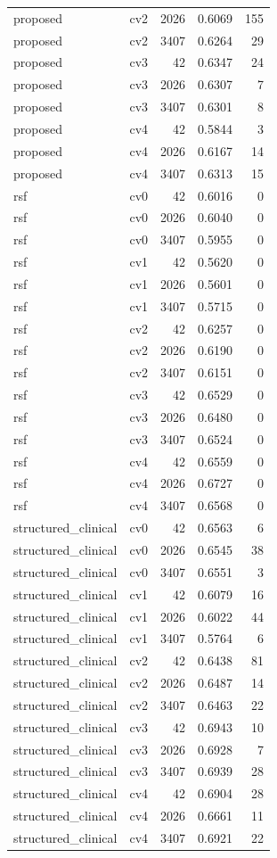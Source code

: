 \documentclass[10pt]{article}
\begin{document}
\begin{longtable}{llrrr}
proposed & cv2 & 2026 & 0.6069 & 155\\
proposed & cv2 & 3407 & 0.6264 & 29\\
proposed & cv3 & 42 & 0.6347 & 24\\
proposed & cv3 & 2026 & 0.6307 & 7\\
proposed & cv3 & 3407 & 0.6301 & 8\\
proposed & cv4 & 42 & 0.5844 & 3\\
proposed & cv4 & 2026 & 0.6167 & 14\\
proposed & cv4 & 3407 & 0.6313 & 15\\
rsf & cv0 & 42 & 0.6016 & 0\\
rsf & cv0 & 2026 & 0.6040 & 0\\
rsf & cv0 & 3407 & 0.5955 & 0\\
rsf & cv1 & 42 & 0.5620 & 0\\
rsf & cv1 & 2026 & 0.5601 & 0\\
rsf & cv1 & 3407 & 0.5715 & 0\\
rsf & cv2 & 42 & 0.6257 & 0\\
rsf & cv2 & 2026 & 0.6190 & 0\\
rsf & cv2 & 3407 & 0.6151 & 0\\
rsf & cv3 & 42 & 0.6529 & 0\\
rsf & cv3 & 2026 & 0.6480 & 0\\
rsf & cv3 & 3407 & 0.6524 & 0\\
rsf & cv4 & 42 & 0.6559 & 0\\
rsf & cv4 & 2026 & 0.6727 & 0\\
rsf & cv4 & 3407 & 0.6568 & 0\\
structured\_clinical & cv0 & 42 & 0.6563 & 6\\
structured\_clinical & cv0 & 2026 & 0.6545 & 38\\
structured\_clinical & cv0 & 3407 & 0.6551 & 3\\
structured\_clinical & cv1 & 42 & 0.6079 & 16\\
structured\_clinical & cv1 & 2026 & 0.6022 & 44\\
structured\_clinical & cv1 & 3407 & 0.5764 & 6\\
structured\_clinical & cv2 & 42 & 0.6438 & 81\\
structured\_clinical & cv2 & 2026 & 0.6487 & 14\\
structured\_clinical & cv2 & 3407 & 0.6463 & 22\\
structured\_clinical & cv3 & 42 & 0.6943 & 10\\
structured\_clinical & cv3 & 2026 & 0.6928 & 7\\
structured\_clinical & cv3 & 3407 & 0.6939 & 28\\
structured\_clinical & cv4 & 42 & 0.6904 & 28\\
structured\_clinical & cv4 & 2026 & 0.6661 & 11\\
structured\_clinical & cv4 & 3407 & 0.6921 & 22\\
\hline\end{longtable}
\end{document}
